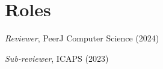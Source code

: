 \section{\sc Roles}

\emph{Reviewer}, PeerJ Computer Science (2024)

\emph{Sub-reviewer}, ICAPS (2023)

